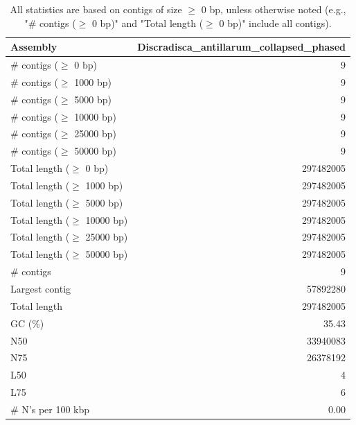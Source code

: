 \documentclass[12pt,a4paper]{article}
\begin{document}
\begin{table}[ht]
\begin{center}
\caption{All statistics are based on contigs of size $\geq$ 0 bp, unless otherwise noted (e.g., "\# contigs ($\geq$ 0 bp)" and "Total length ($\geq$ 0 bp)" include all contigs).}
\begin{tabular}{|l*{1}{|r}|}
\hline
Assembly & Discradisca\_antillarum\_collapsed\_phased \\ \hline
\# contigs ($\geq$ 0 bp) & 9 \\ \hline
\# contigs ($\geq$ 1000 bp) & 9 \\ \hline
\# contigs ($\geq$ 5000 bp) & 9 \\ \hline
\# contigs ($\geq$ 10000 bp) & 9 \\ \hline
\# contigs ($\geq$ 25000 bp) & 9 \\ \hline
\# contigs ($\geq$ 50000 bp) & 9 \\ \hline
Total length ($\geq$ 0 bp) & 297482005 \\ \hline
Total length ($\geq$ 1000 bp) & 297482005 \\ \hline
Total length ($\geq$ 5000 bp) & 297482005 \\ \hline
Total length ($\geq$ 10000 bp) & 297482005 \\ \hline
Total length ($\geq$ 25000 bp) & 297482005 \\ \hline
Total length ($\geq$ 50000 bp) & 297482005 \\ \hline
\# contigs & 9 \\ \hline
Largest contig & 57892280 \\ \hline
Total length & 297482005 \\ \hline
GC (\%) & 35.43 \\ \hline
N50 & 33940083 \\ \hline
N75 & 26378192 \\ \hline
L50 & 4 \\ \hline
L75 & 6 \\ \hline
\# N's per 100 kbp & 0.00 \\ \hline
\end{tabular}
\end{center}
\end{table}
\end{document}
